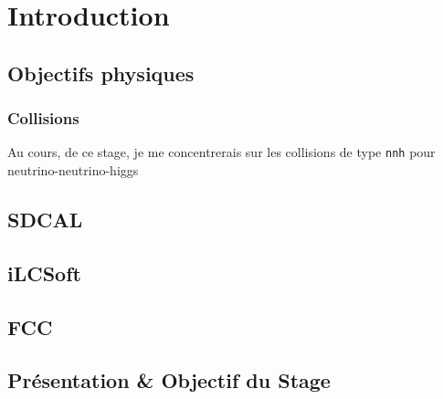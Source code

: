 \chapter{Introduction}

\section{Objectifs physiques}

\subsection{Collisions}
Au cours, de ce stage, je me concentrerais sur les collisions de type \texttt{nnh} pour neutrino-neutrino-higgs

\section{SDCAL}

\section{iLCSoft}

\section{FCC}

\section{Présentation \& Objectif du Stage}

